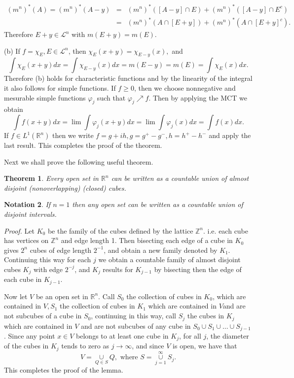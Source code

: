 \documentclass[12pt]{report}
\newtheorem{theorem}{Theorem}[section]
\newtheorem{no}[theorem]{Notation}
\begin{document}
\begin{eqnarray*}
(m^n)^*(A) = (m^n)^* (A - y) &=& (m^n)^* ([A-y] \cap E) + (m^n)^* ([A-y]
\cap E^c)\\
&=& (m^n)^* (A \cap [E + y]) + (m^n)^* (A \cap [E + y]^c).
\end{eqnarray*}
Therefore $E + y \in \mathcal{L}^n$ with $m (E+y) = m(E)$.

\medskip
\noindent
(b)  If $f = \chi_E, E \in \mathcal{L}^n$, then $\chi_E(x + y) =
\chi_{E-y}(x),$ and
\[\int \chi_E(x+y) dx = \int \chi_{E-y} (x) dx = m(E-y) = m(E) = \int
\chi_E (x) dx.
\]
Therefore (b) holds for characteristic functions and by the linearity of
the integral it also follows for  simple functions.  If $f \ge 0$, then we
choose nonnegative and mesurable simple functions $\varphi_j$ such
that
$\varphi_j \nearrow f$.  Then by applying the MCT we obtain
\[
\int f(x+y) dx = \lim \int \varphi_j (x+y) dx = \lim \int \varphi_j (x) dx
= \int f(x) dx.
\]
If $f \in L^1 (\mathbb{R}^n)$ then we write $f = g + ih, g = g^+ - g^-, h =
h^+ - h^-$ and apply the last result.  This completes the proof of the
theorem.

\vspace{.15cm}
\noindent
Next we shall prove the following useful theorem.

\begin{theorem}  Every open set in $\mathbb{R}^n$ can be
written as a countable union of almost disjoint (nonoverlapping) 
(closed) cubes.
\end{theorem}

\begin{no}  If $n = 1$ then any open set can be written as a countable
union of disjoint intervals.
\end{no}


\noindent
{\em Proof.}  Let $K_0$ be the family of the cubes defined by the
lattice $\mathbb{Z}^n$. i.e. each cube has vertices on $\mathbb{Z}^n$ and
edge length 1. Then bisecting each edge  of a cube in $K_0$ gives $2^n$
 cubes of edge length $2^{-1}$, and obtain a new family denoted by
$K_1.$  Continuing this way for each $j$ we obtain a countable family of
almost disjoint cubes $K_j$ with  edge $2^{-j}$, and $K_j$ results for
$K_{j-1}$ by bisecting then the edge of each cube in $K_{j-1}$.

Now let $V$ be an open set in $\mathbb{R}^n$. Call $S_0$ the collection
of cubes in $K_0$, which are contained in $V, S_1$ the collection of
cubes in
$K_1$ which are contained in $V$and are not subcubes of a cube in
$S_0$, continuing in this way,  call $S_j$ the cubes in $K_j$ which are
contained in $V$ and are not subcubes of any  cube in $S_0 \cup S_1 \cup
\dots \cup S_{j-1}$.  Since any point $x \in V$ belongs to at least one
cube in $K_j$, for all $j$, the diameter of the cubes in $K_j$ tends to zero
as $j \to \infty$,  and since $V$ is open, we have that 
\[
V = \underset{Q \in S}{\cup} Q, \mbox{ where } S =
\overset{\infty}{\underset{j=1}{\cup}} S_j.
\]
This completes the proof of the lemma.
\end{document}

